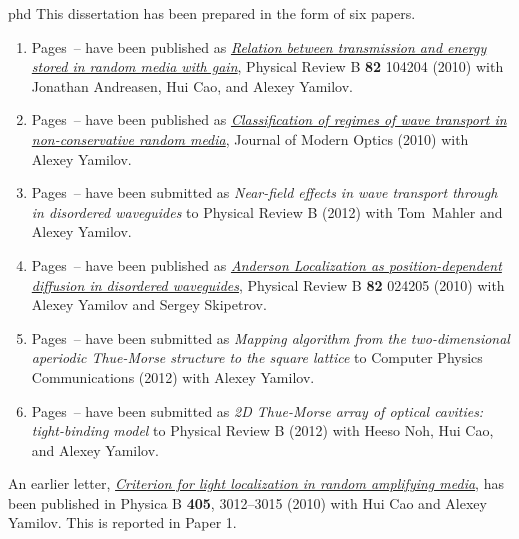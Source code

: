 \documentclass[times,12pt,titlepage]{mstthesis} %
\begin{document}


\begin{ThesisPublicationOption}{phd}
This dissertation has been prepared in the form of six papers.

\renewcommand{\theenumi}{Paper \arabic{enumi}}
\begin{enumerate}%

\item Pages~\pageref{paper:1_start}--\pageref{paper:1_end} have been published as  
  \textit{\href{http://link.aps.org/doi/10.1103/PhysRevB.82.104204}{Relation between transmission and energy stored in random media with gain}}, Physical Review B \textbf{82} 104204 (2010) with Jonathan Andreasen, Hui Cao, and Alexey Yamilov.
\item Pages~\pageref{paper:2_start}--\pageref{paper:2_end} have been published as 
  \textit{\href{http://dx.doi.org/10.1080/09500340.2010.519443}{Classification of regimes of wave transport in non-conservative random media}}, Journal of Modern Optics (2010) with Alexey Yamilov.
\item Pages~\pageref{paper:3_start}--\pageref{paper:3_end} have been submitted as
  \textit{Near-field effects in wave transport through in disordered waveguides} to Physical Review B (2012) with Tom~Mahler and Alexey Yamilov.
\item Pages~\pageref{paper:4_start}--\pageref{paper:4_end} have been published as 
  \textit{\href{http://link.aps.org/doi/10.1103/PhysRevB.82.024205}{Anderson Localization as position-dependent diffusion in disordered waveguides}}, 
  Physical Review B \textbf{82} 024205 (2010) with Alexey Yamilov and Sergey Skipetrov.  
\item Pages~\pageref{paper:5_start}--\pageref{paper:5_end} have been submitted as 
  \textit{Mapping algorithm from the two-dimensional aperiodic Thue-Morse structure to the square lattice} to Computer Physics Communications (2012) with Alexey Yamilov.
\item Pages~\pageref{paper:6_start}--\pageref{paper:6_end} have been submitted as 
  \textit{2D Thue-Morse array of optical cavities: tight-binding model} to Physical Review B (2012) with Heeso Noh, Hui Cao, and Alexey Yamilov.
\end{enumerate}
\renewcommand{\theenumi}{\arabic{enumi}}

An earlier letter, 
\textit{\href{http://dx.doi.org/10.1016/j.physb.2010.01.025}{Criterion for light localization in random amplifying media}}, 
has been published in Physica B \textbf{405}, 3012--3015 (2010) with Hui Cao and Alexey Yamilov. This is reported in Paper 1.

\end{ThesisPublicationOption}
\end{document}
